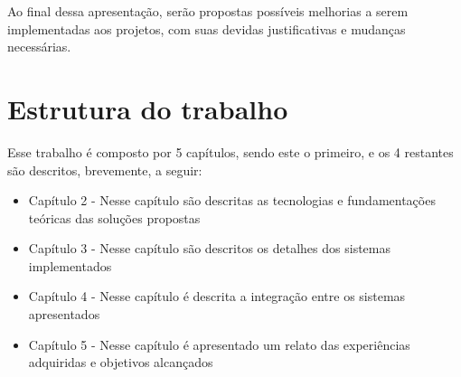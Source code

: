 Ao final dessa apresentação, serão propostas possíveis melhorias a serem implementadas aos projetos, com suas devidas justificativas e mudanças necessárias.


\section{Estrutura do trabalho}

Esse trabalho é composto por 5 capítulos, sendo este o primeiro, e os 4 restantes são descritos, brevemente, a seguir:

\begin{itemize}
    \item Capítulo 2 - Nesse capítulo são descritas as tecnologias e fundamentações teóricas das soluções propostas
    \item Capítulo 3 - Nesse capítulo são descritos os detalhes dos sistemas implementados
    \item Capítulo 4 - Nesse capítulo é descrita a integração entre os sistemas apresentados
    \item Capítulo 5 - Nesse capítulo é apresentado um relato das experiências adquiridas e objetivos alcançados
\end{itemize}

